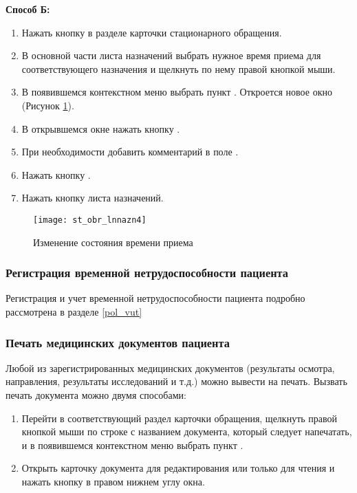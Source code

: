 \textbf{Способ Б:}
\begin{enumerate}
 \item Нажать кнопку  в разделе  карточки стационарного обращения.
 \item В основной части листа назначений выбрать нужное время приема для соответствующего назначения и щелкнуть по нему правой кнопкой мыши.
 \item В появившемся контекстном меню выбрать пункт . Откроется новое окно (Рисунок \ref{img_st_obr_lnnazn4}).
 \item В открывшемся окне нажать кнопку .
 \item При необходимости добавить комментарий в поле .
 \item Нажать кнопку .
 \item Нажать кнопку  листа назначений.
\end{enumerate}

\begin{figure}[ht]\centering
   \texttt{[image: st\_obr\_lnnazn4]}
   \caption{Изменение состояния времени приема}
   \label{img_st_obr_lnnazn4}
\end{figure} 

\subsubsection{Регистрация временной нетрудоспособности пациента}

Регистрация и учет временной нетрудоспособности пациента подробно рассмотрена в разделе \ref{pol_vut}

\subsubsection{Печать медицинских документов пациента}

Любой из зарегистрированных медицинских документов (результаты осмотра, направления, результаты исследований и т.д.) можно вывести на печать. Вызвать печать документа можно двумя способами:
\begin{enumerate}
 \item Перейти в соответствующий раздел карточки обращения, щелкнуть правой кнопкой мыши по строке с названием документа, который следует напечатать, и в появившемся контекстном меню выбрать пункт .
 \item Открыть карточку документа для редактирования или только для чтения и нажать кнопку   в правом нижнем углу окна.
\end{enumerate}
 
